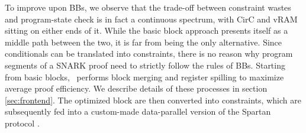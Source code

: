 To improve upon BBs, we observe that the trade-off between constraint wastes and program-state check is in fact a continuous spectrum, with CirC and vRAM sitting on either ends of it. While the basic block approach presents itself as a middle path between the two, it is far from being the only alternative. Since conditionals can be translated into constraints, there is no reason why program segments of a SNARK proof need to strictly follow the rules of BBs. Starting from basic blocks, \CoBBl~performs block merging and register spilling to maximize average proof efficiency. We describe details of these processes in section \ref{sec:frontend}. The optimized block are then converted into constraints, which are subsequently fed into a custom-made data-parallel version of the Spartan protocol \cite{setty19spartan}.

